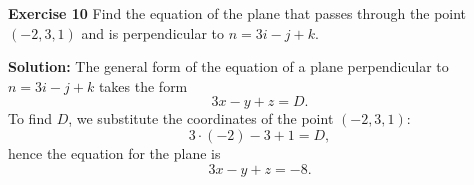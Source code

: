 \documentclass[12pt,oneside]{exam}
\newenvironment{exercise}[1]{\vspace{.1in}\noindent\textbf{Exercise #1 \hspace{.05em}}}{}
\newenvironment{newsolution}{\vspace{.1in}\noindent\textbf{Solution: \hspace{.05em}}}{}
\begin{document}
\begin{exercise}{10} 
Find the equation of the plane that passes through the point $(-2,3,1)$ and is perpendicular to $n=3i - j + k$.
\end{exercise}

\begin{newsolution}
The general form of the equation of a plane perpendicular to $n = 3i - j +k$ takes the form
\begin{equation*}
3x-y+z = D.
\end{equation*}
To find $D$, we substitute the coordinates of the point $(-2,3,1)$:
\begin{equation*}
3\cdot (-2) - 3 + 1 = D,
\end{equation*}
hence the equation for the plane is 
\begin{equation*}
3x-y+z = -8.
\end{equation*}
\end{newsolution}
\end{document}
